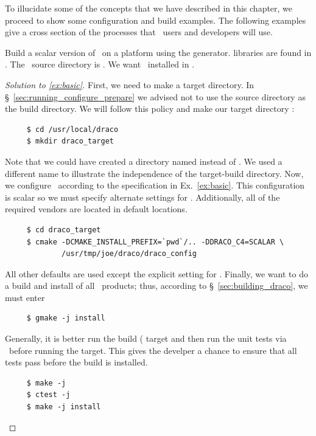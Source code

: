 To illucidate some of the concepts that we have described in this
chapter, we proceed to show some configuration and build examples.
The following examples give a cross section of the processes that
\draco\ users and developers will use.
\begin{cexa}
  \label{ex:basic}
  Build a scalar version of \draco\ on a  platform using the  generator.  
   libraries are found in \ldlib.
  The \draco\ source directory is .  
  We want \draco\ installed in .
\end{cexa}
\begin{proof}[Solution to \ref{ex:basic}]
  First, we need to make a target directory.  In
  \S~\ref{sec:running_configure_prepare} we advised not to use the source
  directory as the build directory.  We will follow this policy and
  make our target directory :
\begin{verbatim}
     $ cd /usr/local/draco
     $ mkdir draco_target
\end{verbatim}
  Note that we could have created a directory named  instead of .
  We used a different name to illustrate the independence of the target-build directory.  Now, we configure
  \draco\ according to the specification in Ex.~\ref{ex:basic}.  This
  configuration is scalar so we must specify alternate settings for
  \cfour.  Additionally, all of the required vendors are located in
  default locations.
\begin{verbatim}
     $ cd draco_target
     $ cmake -DCMAKE_INSTALL_PREFIX=`pwd`/.. -DDRACO_C4=SCALAR \
             /usr/tmp/joe/draco/draco_config
\end{verbatim}
  All other defaults are used except the explicit setting for .
  Finally, we want to do a build and install of all \draco\ products;
  thus, according to \S~\ref{sec:building_draco}, we must enter
\begin{verbatim}
     $ gmake -j install
\end{verbatim} %
  Generally, it is better run the build ( target and then run the unit tests via \ctest\
  before running the  target.  This gives the develper a chance to ensure that all tests
  pass before the build is installed.
\begin{verbatim}
     $ make -j 
     $ ctest -j
     $ make -j install
\end{verbatim} %
\end{proof}

